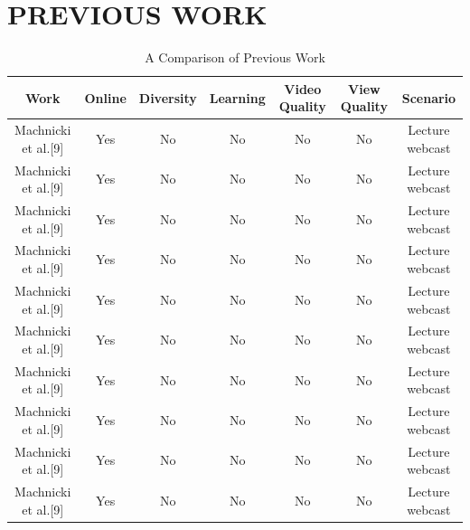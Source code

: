 \documentclass{sig-alternate}
\begin{document}
\section {PREVIOUS WORK}
\begin{table}
\begin{center}
    
 \caption{A Comparison of Previous Work}
 \begin{tabular}{ c | c | c | c | c | c | c} 
 \hline
 Work & Online & Diversity & Learning & Video Quality & View Quality & Scenario\\  
 \hline
 Machnicki et al.[9] & Yes & No & No & No & No & Lecture webcast \\ 
 \hline
 Machnicki et al.[9] & Yes & No & No & No & No & Lecture  webcast \\
 \hline
 Machnicki et al.[9] & Yes & No & No & No & No & Lecture  webcast \\

\hline
 Machnicki et al.[9] & Yes & No & No & No & No & Lecture  webcast \\

\hline
 Machnicki et al.[9] & Yes & No & No & No & No & Lecture  webcast \\

\hline
 Machnicki et al.[9] & Yes & No & No & No & No & Lecture webcast \\

\hline
 Machnicki et al.[9] & Yes & No & No & No & No & Lecture webcast \\

\hline
 Machnicki et al.[9] & Yes & No & No & No & No & Lecture webcast \\

\hline
 Machnicki et al.[9] & Yes & No & No & No & No & Lecture webcast \\

\hline
 Machnicki et al.[9] & Yes & No & No & No & No & Lecture webcast \\
\hline

\end{tabular}
\end{center}
\end{table}
\end{document}

